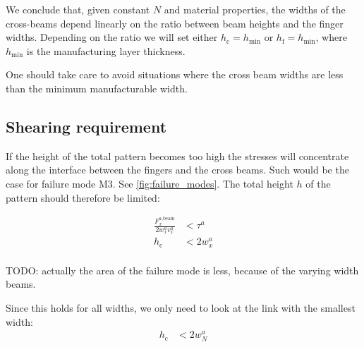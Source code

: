 We conclude that, given constant $N$ and material properties,
the widths of the cross-beams depend linearly on the ratio between beam heights and the finger widths.
Depending on the ratio we will set either $h_\text{c} = h_\text{min}$ or $h_\text{f} = h_\text{min}$,
where $h_\text{min}$ is the manufacturing layer thickness.

One should take care to avoid situations where the cross beam widths are less than the minimum manufacturable width.






\subsection{Shearing requirement}
If the height of the total pattern becomes too high the stresses will concentrate along the interface between the fingers and the cross beams.
Such would be the case for failure mode M3.
See \cref{fig:failure_modes}.
The total height $h$ of the pattern should therefore be limited:


\begin{align*}
	\frac{F^{a \text{,beam}}_x }{2w^a_x v^a_x} &< \tau^a \\
	h_\text{c} &< 2 w^a_x  \\
\end{align*}

TODO: actually the area of the failure mode is less, because of the varying width beams.

Since this holds for all widths, we only need to look at the link with the smallest width:
\begin{align*}
	h_\text{c} &< 2 w^a_N \\
\end{align*}

